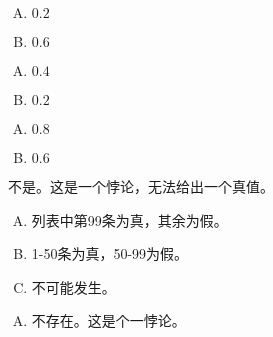 {{        %
        \begin{practices}
            \begin{enumerate}[A.]
                \item $0.2$
                \item $0.6$
            \end{enumerate}
        \end{practices}

        \begin{practices}
            \begin{enumerate}[A.]
                \item $0.4$
                \item $0.2$
            \end{enumerate}
        \end{practices}

        \begin{practices}
            \begin{enumerate}[A.]
                \item $0.8$
                \item $0.6$
            \end{enumerate}
        \end{practices}

        \begin{practices}
            不是。这是一个悖论，无法给出一个真值。
        \end{practices}

        \begin{practices}
            \begin{enumerate}[A.]
                \item 列表中第99条为真，其余为假。
                \item 1-50条为真，50-99为假。
                \item 不可能发生。
            \end{enumerate}
        \end{practices}

        \begin{practices}
            \begin{enumerate}[A.]
                \item 不存在。这是个一悖论。
            \end{enumerate}
        \end{practices}
    }
}

